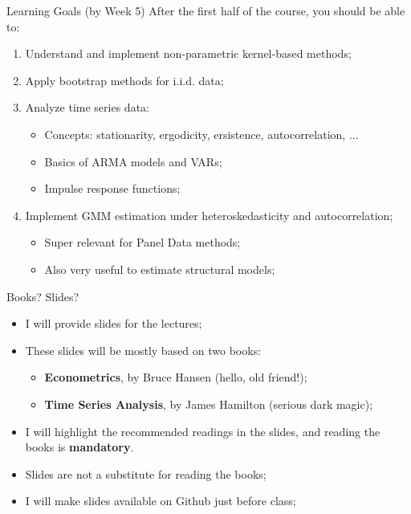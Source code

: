 \documentclass[aspectratio=169, xcolor=dvipsnames, 12pt]{beamer}
\begin{document}
\begin{frame}{Learning Goals (by Week 5)}
  After the first half of the course, you should be able to:

  \begin{enumerate}\itemsep1em
    \item Understand and implement non-parametric kernel-based methods;
    \item Apply bootstrap methods for i.i.d. data;
    \item Analyze time series data:
      \begin{itemize}
        \item Concepts: stationarity, ergodicity, ersistence, autocorrelation, ...
        \item Basics of ARMA models and VARs;
        \item Impulse response functions;
      \end{itemize}
    \item Implement GMM estimation under heteroskedasticity and autocorrelation;
    \begin{itemize}
      \item Super relevant for Panel Data methods;
      \item Also very useful to estimate structural models;
    \end{itemize}
  \end{enumerate}
\end{frame}

\begin{frame}{Books? Slides?}
  \begin{itemize}\itemsep1em
    \item I will provide slides for the lectures;
    \item These slides will be mostly based on two books:
      \begin{itemize}
        \item \textbf{Econometrics}, by Bruce Hansen (hello, old friend!);
        \item \textbf{Time Series Analysis}, by James Hamilton (serious dark magic);
      \end{itemize}
    \item I will highlight the recommended readings in the slides, and reading the books is \textbf{mandatory}.
    \item Slides are not a substitute for reading the books;
    \item I will make slides available on Github just before class;
  \end{itemize}
\end{frame}
\end{document}
